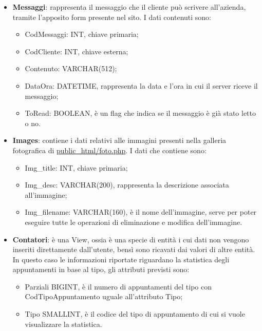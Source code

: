 {{\begin{itemize}
					\begin{itemize}\itemsep1pt
						\item CodAccount: SMALLINT, chiave primaria;
						\item username: VARCHAR(20);
						\item password: VARCHAR(32), contiene la versione cifrata della password dell'utente.
					\end{itemize}
				\item \textbf{Messaggi}: rappresenta il messaggio che il cliente può scrivere all'azienda, tramite l'apposito form presente nel sito. I dati contenuti sono:
					\begin{itemize}\itemsep1pt
						\item CodMessaggi: INT, chiave primaria;
						\item CodCliente: INT, chiave esterna;
						\item Contenuto: VARCHAR(512);
						\item DataOra: DATETIME, rappresenta la data e l'ora in cui il server riceve il messaggio;
						\item ToRead: BOOLEAN, è un flag che indica se il messaggio è già stato letto o no.
					\end{itemize}
				\item \textbf{Images}: contiene i dati relativi alle immagini presenti nella galleria fotografica di \href{http://tecnologie-web.studenti.math.unipd.it/tecweb/~pgabelli/public\_html/foto.php}{public\_html/foto.php}. I dati che contiene sono:
					\begin{itemize}\itemsep1pt
						\item Img\_title: INT, chiave primaria;
						\item Img\_desc: VARCHAR(200), rappresenta la descrizione associata all'immagine;
						\item Img\_filename: VARCHAR(160), è il nome dell'immagine, serve per poter eseguire tutte le operazioni di eliminazione e modifica dell'immagine.
					\end{itemize}
				\item \textbf{Contatori}: è una View, ossia è una specie di entità i cui dati non vengono inseriti direttamente dall'utente, bensì sono ricavati dai valori di altre entità. In questo caso le informazioni riportate riguardano la statistica degli appuntamenti in base al tipo, gli attributi previsti sono:
					\begin{itemize}
						\item Parziali BIGINT, è il numero di appuntamenti del tipo con CodTipoAppuntamento uguale all'attributo Tipo;
						\item Tipo SMALLINT, è il codice del tipo di appuntamento di cui si vuole visualizzare la statistica.
					\end{itemize}
			\end{itemize}
	}
	
}
